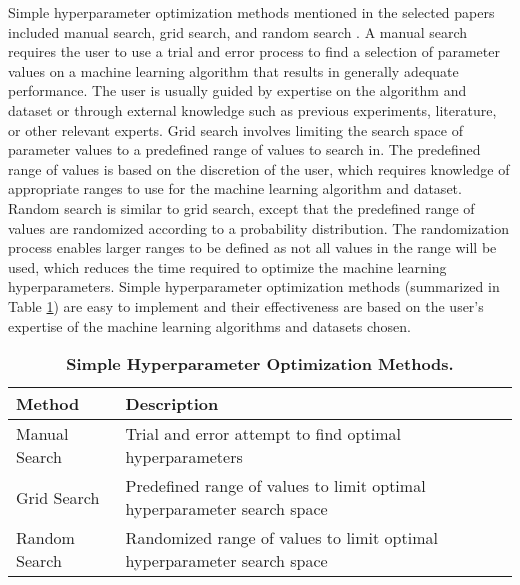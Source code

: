 Simple hyperparameter optimization methods mentioned in the selected papers included manual search, grid search, and random search \cite{Bergstra:2012}. A manual search requires the user to use a trial and error process to find a selection of parameter values on a machine learning algorithm that results in generally adequate performance. The user is usually guided by expertise on the algorithm and dataset or through external knowledge such as previous experiments, literature, or other relevant experts. Grid search involves limiting the search space of parameter values to a predefined range of values to search in. The predefined range of values is based on the discretion of the user, which requires knowledge of appropriate ranges to use for the machine learning algorithm and dataset. Random search is similar to grid search, except that the predefined range of values are randomized according to a probability distribution. The randomization process enables larger ranges to be defined as not all values in the range will be used, which reduces the time required to optimize the machine learning hyperparameters. Simple hyperparameter optimization methods (summarized in Table \ref{table:simple_methods}) are easy to implement and their effectiveness are based on the user's expertise of the machine learning algorithms and datasets chosen.

\begin{table}
\centering
\caption{\textbf{Simple Hyperparameter Optimization Methods.}}
\label{table:simple_methods}
\begin{tabular}{p{1in}p{2in}}
	\toprule
	\textbf{Method} & \textbf{Description}\\
	\midrule \addlinespace
	Manual Search & Trial and error attempt to find optimal hyperparameters
	\addlinespace\\ 
	Grid Search & Predefined range of values to limit optimal hyperparameter search space
	\addlinespace\\ 
	Random Search & Randomized range of values to limit optimal hyperparameter search space
	\addlinespace \\
	\bottomrule
\end{tabular}
\end{table}


